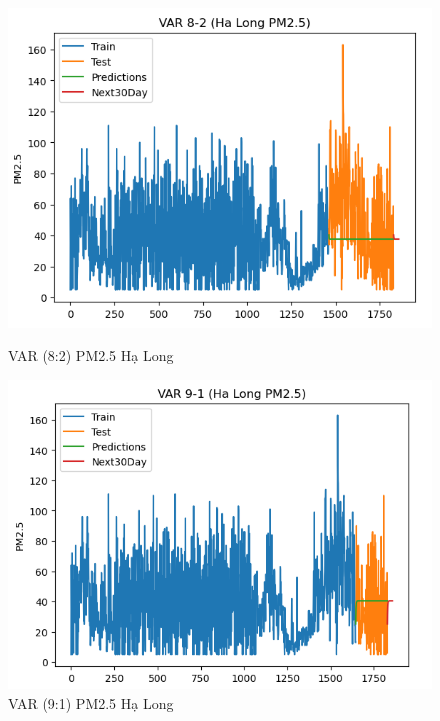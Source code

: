 \begin{figure}[h]
\begin{minipage}[b]{0.45\linewidth}
        \includegraphics[width=\linewidth]{img/VAR_8_2_HL.png}
        \caption{\scriptsize VAR (8:2) PM2.5 Hạ Long}
        \label{fig1}
    \end{minipage}\hfill
    \begin{minipage}[b]{0.45\linewidth}
        \centering
        \includegraphics[width=\linewidth]{img/VAR_9_1_HL.png}
        \caption{\scriptsize VAR (9:1) PM2.5 Hạ Long}
        \label{fig2}
    \end{minipage}
    \begin{minipage}[b]{0.45\linewidth}
        \centering

\end{minipage}
\end{figure}
